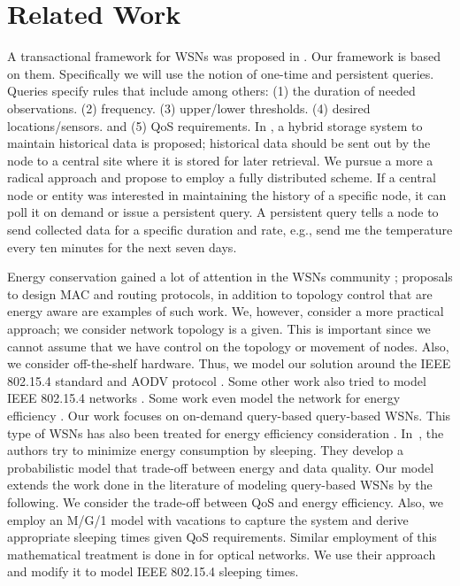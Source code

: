\section{Related Work} \label{sec:relwork}

A transactional framework for WSNs was proposed in \cite{2, 24}. Our framework is based on them. Specifically we will use the notion of one-time and persistent queries. Queries specify rules that include among others: (1) the duration of needed observations. (2) frequency. (3) upper/lower thresholds. (4) desired locations/sensors. and (5) QoS requirements. In \cite{2}, a hybrid storage system to maintain historical data is proposed; historical data should be sent out by the node to a central site where it is stored for later retrieval. We pursue a more a radical approach and propose to employ a fully distributed scheme. If a central node or entity was interested in maintaining the history of a specific node, it can poll it on demand or issue a persistent query. A persistent query tells a node to send collected data for a specific duration and rate, e.g., send me the temperature every ten minutes for the next seven days.

Energy conservation gained a lot of attention in the WSNs community \cite{1,5,6,7}; proposals to design MAC and routing protocols, in addition to topology control that are energy aware are examples of such work. We, however, consider a more practical approach; we consider network topology is a given. This is important since we cannot assume that we have control on the topology or movement of nodes. Also, we consider off-the-shelf hardware. Thus, we model our solution around the IEEE 802.15.4 standard and AODV protocol \cite{aodv}. Some other work also tried to model IEEE 802.15.4 networks \cite{8,9,10,4.11,12,13}. Some work even model the network for energy efficiency \cite{10,12,13}. Our work focuses on on-demand query-based query-based WSNs. This type of WSNs has also been treated for energy efficiency consideration \cite{14,25}. In~\cite{25}, the authors try to minimize energy consumption by sleeping. They develop a probabilistic model that trade-off between energy and data quality. Our model extends the work done in the literature of modeling query-based WSNs by the following. We consider the trade-off between QoS and energy efficiency. Also, we employ an M/G/1 model with vacations to capture the system and derive appropriate sleeping times given QoS requirements. Similar employment of this mathematical treatment is done in \cite{15} for optical networks. We use their approach and modify it to model IEEE 802.15.4 sleeping times.

